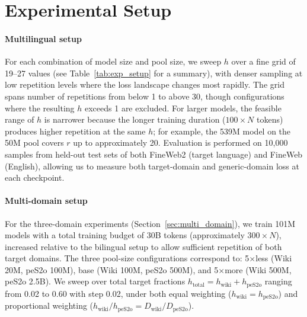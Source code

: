 \section{Experimental Setup}
\label{app:exp_details}

\paragraph{Multilingual setup}
For each combination of model size and pool size, we sweep $h$ over a fine grid of 19--27 values (see Table~\ref{tab:exp_setup} for a summary), with denser sampling at low repetition levels where the loss landscape changes most rapidly. The grid spans number of repetitions from below 1 to above 30, though configurations where the resulting $h$ exceeds 1 are excluded.
For larger models, the feasible range of $h$ is narrower because the longer training duration ($100 \times N$ tokens) produces higher repetition at the same $h$; for example, the 539M model on the 50M pool covers $r$ up to approximately 20.
Evaluation is performed on 10,000 samples from held-out test sets of both FineWeb2 (target language) and FineWeb (English), allowing us to measure both target-domain and generic-domain loss at each checkpoint.

\paragraph{Multi-domain setup}
For the three-domain experiments (Section~\ref{sec:multi_domain}), we train 101M models with a total training budget of 30B tokens (approximately $300 \times N$), increased relative to the bilingual setup to allow sufficient repetition of both target domains.
The three pool-size configurations correspond to: 5$\times$less (Wiki 20M, peS2o 100M), base (Wiki 100M, peS2o 500M), and 5$\times$more (Wiki 500M, peS2o 2.5B).
We sweep over total target fractions $h_{\text{total}} = h_{\text{wiki}} + h_{\text{peS2o}}$ ranging from 0.02 to 0.60 with step 0.02, under both equal weighting ($h_{\text{wiki}} = h_{\text{peS2o}}$) and proportional weighting ($h_{\text{wiki}} / h_{\text{peS2o}} = D_{\text{wiki}} / D_{\text{peS2o}}$).

